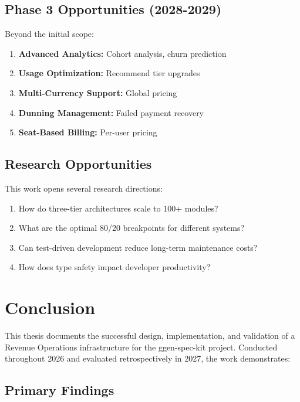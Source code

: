 \documentclass[12pt]{report}
\begin{document}
\section{Phase 3 Opportunities (2028-2029)}

Beyond the initial scope:

\begin{enumerate}
    \item \textbf{Advanced Analytics:} Cohort analysis, churn prediction
    \item \textbf{Usage Optimization:} Recommend tier upgrades
    \item \textbf{Multi-Currency Support:} Global pricing
    \item \textbf{Dunning Management:} Failed payment recovery
    \item \textbf{Seat-Based Billing:} Per-user pricing
\end{enumerate}

\section{Research Opportunities}

This work opens several research directions:

\begin{enumerate}
    \item How do three-tier architectures scale to 100+ modules?
    \item What are the optimal 80/20 breakpoints for different systems?
    \item Can test-driven development reduce long-term maintenance costs?
    \item How does type safety impact developer productivity?
\end{enumerate}

\chapter{Conclusion}

This thesis documents the successful design, implementation, and validation of a Revenue Operations infrastructure for the ggen-spec-kit project. Conducted throughout 2026 and evaluated retrospectively in 2027, the work demonstrates:

\section{Primary Findings}
\end{document}
